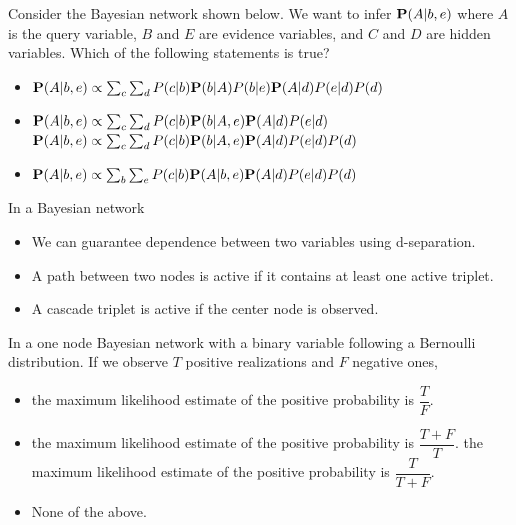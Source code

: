 \documentclass[11pt, a4paper]{article}
\begin{document}
Consider the Bayesian network shown below. We want to infer ${\bf P}(A | b, e)$ where $A$ is the query variable, $B$ and $E$ are evidence variables, and $C$ and $D$ are hidden variables. Which of the following statements is true?
\begin{center}
\end{center}
\begin{itemize}
    \item ${\bf P}(A | b, e) \propto \sum_c \sum_d P(c|b) {\bf P}(b | A) P(b|e) {\bf P}(A | d) P(e|d) P(d)$
    \item ${\bf P}(A | b, e) \propto \sum_c \sum_d P(c|b) {\bf P}(b | A, e) {\bf P}(A|d) P(e|d)$
    \solitem ${\bf P}(A | b, e) \propto \sum_c \sum_d P(c|b) {\bf P}(b | A, e) {\bf P}(A | d) P(e|d) P(d)$ %
    \item ${\bf P}(A | b, e) \propto \sum_b \sum_e P(c | b) {\bf P}(A | b,e) {\bf P}(A | d) P(e|d) P(d)$
\end{itemize}

In a Bayesian network
\begin{itemize}
    \solitem Independence between two variables is guaranteed if all path connecting them are inactive.
    \item We can guarantee dependence between two variables using d-separation.
    \item A path between two nodes is active if it contains at least one active triplet.
    \item A cascade triplet is active if the center node is observed.
\end{itemize}

In a one node Bayesian network with a binary variable following a Bernoulli distribution. If we observe $T$ positive realizations and $F$ negative ones,
\begin{itemize}
    \item the maximum likelihood estimate of the positive probability is $\dfrac{T}{F}$.
    \item the maximum likelihood estimate of the positive probability is $\dfrac{T + F}{T}$.
    \solitem the maximum likelihood estimate of the positive probability is $\dfrac{T}{T + F}$.
    \item None of the above.
\end{itemize}
\end{document}
